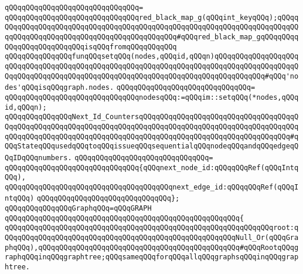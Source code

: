 \verb|qQQqqQQqqQQqqQQqqQQqqQQqqQQqqQQq=|\newline
\verb|qQQqqQQqqQQqqQQqqQQqqQQqqQQqqQQqred_black_map_g(qQQqint_keyqQQq);qQQqqQQqqQQqqQQqqQQqqQQqqQQqqQQqqQQqqQQqqQQqqQQqqQQqqQQqqQQqqQQqqQQqqQQqqQQqqQQqqQQqqQQqqQQqqQQqqQQqqQQqqQQqqQQqqQQq#qQQqred_black_map_gqQQqqQQqqQQqqQQqqQQqqQQqqQQqisqQQqfromqQQqqQQqqQQq|\newline
\newline
\newline
\verb|qQQqqQQqqQQqqQQqfunqQQqsetqQQq(nodes,qQQqid,qQQqn)qQQqqQQqqQQqqQQqqQQqqQQqqQQqqQQqqQQqqQQqqQQqqQQqqQQqqQQqqQQqqQQqqQQqqQQqqQQqqQQqqQQqqQQqqQQqqQQqqQQqqQQqqQQqqQQqqQQqqQQqqQQqqQQqqQQqqQQqqQQqqQQqqQQqqQQq#qQQq'nodes'qQQqisqQQqgraph.nodes.|\newline
\verb|qQQqqQQqqQQqqQQqqQQqqQQqqQQqqQQq=|\newline
\verb|qQQqqQQqqQQqqQQqqQQqqQQqqQQqqQQqnodesqQQq:=qQQqim::setqQQq(*nodes,qQQqid,qQQqn);|\newline
\newline
\newline
\verb|qQQqqQQqqQQqqQQqNext_Id_CountersqQQqqQQqqQQqqQQqqQQqqQQqqQQqqQQqqQQqqQQqqQQqqQQqqQQqqQQqqQQqqQQqqQQqqQQqqQQqqQQqqQQqqQQqqQQqqQQqqQQqqQQqqQQqqQQqqQQqqQQqqQQqqQQqqQQqqQQqqQQqqQQqqQQqqQQqqQQqqQQqqQQqqQQqqQQqqQQq#qQQqStateqQQqusedqQQqtoqQQqissueqQQqsequentialqQQqnodeqQQqandqQQqedgeqQQqIDqQQqnumbers.|\newline
\verb|qQQqqQQqqQQqqQQqqQQqqQQqqQQqqQQq=|\newline
\verb|qQQqqQQqqQQqqQQqqQQqqQQqqQQqqQQq{qQQqnext_node_id:qQQqqQQqRef(qQQqIntqQQq),|\newline
\verb|qQQqqQQqqQQqqQQqqQQqqQQqqQQqqQQqqQQqqQQqnext_edge_id:qQQqqQQqRef(qQQqIntqQQq)|\newline
\verb|qQQqqQQqqQQqqQQqqQQqqQQqqQQqqQQq};|\newline
\newline
\newline
\verb|qQQqqQQqqQQqqQQqGraphqQQq=qQQqGRAPH|\newline
\verb|qQQqqQQqqQQqqQQqqQQqqQQqqQQqqQQqqQQqqQQqqQQqqQQqqQQqqQQq{|\newline
\verb|qQQqqQQqqQQqqQQqqQQqqQQqqQQqqQQqqQQqqQQqqQQqqQQqqQQqqQQqqQQqqQQqroot:qQQqqQQqqQQqqQQqqQQqqQQqqQQqqQQqqQQqqQQqqQQqqQQqqQQqqQQqNull_Or(qQQqGraphqQQq),qQQqqQQqqQQqqQQqqQQqqQQqqQQqqQQqqQQqqQQqqQQqqQQq#qQQqRootqQQqgraphqQQqinqQQqgraphtree;qQQqsameqQQqforqQQqallqQQqgraphsqQQqinqQQqgraphtree.|\newline
